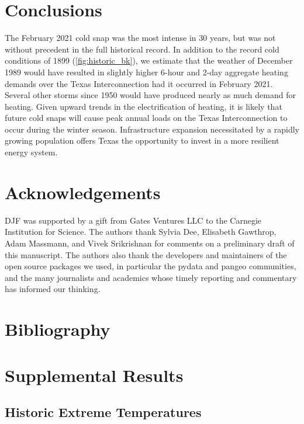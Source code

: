 \documentclass[12pt]{iopart}
\begin{document}
\section{Conclusions}

The February 2021 cold snap was the most intense in 30 years, but was not without precedent in the full historical record.
In addition to the record cold conditions of 1899 (\cref{fig:historic_bk}), we estimate that the weather of December 1989 would have resulted in slightly higher 6-hour and 2-day aggregate heating demands over the Texas Interconnection had it occurred in February 2021.
Several other storms since 1950 would have produced nearly as much demand for heating.
Given upward trends in the electrification of heating, it is likely that future cold snaps will cause peak annual loads on the Texas Interconnection to occur during the winter season.
Infrastructure expansion necessitated by a rapidly growing population offers Texas the opportunity to invest in a more resilient energy system.

\section*{Acknowledgements}

DJF was supported by a gift from Gates Ventures LLC to the Carnegie Institution for Science.
The authors thank
Sylvia Dee,
Elisabeth Gawthrop,
Adam Massmann,
and
Vivek Srikrishnan
for comments on a preliminary draft of this manuscript.
The authors also thank the developers and maintainers of the open source packages we used, in particular the pydata and pangeo communities, and the many journalists and academics whose timely reporting and commentary has informed our thinking.

\section*{Bibliography}



\clearpage
\appendix
\section{Supplemental Results}
\renewcommand{\thefigure}{S\arabic{figure}}
\setcounter{figure}{0}

\subsection{Historic Extreme Temperatures}
\end{document}
